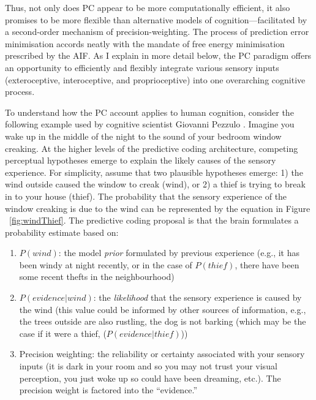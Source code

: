 \begin{CJK}{UTF8}{gbsn}
Thus, not only does PC appear to be more computationally efficient, it also promises to be more flexible than alternative models of cognition---facilitated by a second-order mechanism of precision-weighting.  The process of prediction error minimisation accords neatly with the mandate of free energy minimisation prescribed by the AIF.  As I explain in more detail below, the PC paradigm offers an opportunity to efficiently and flexibly integrate various sensory inputs (exteroceptive, interoceptive, and proprioceptive) into one overarching cognitive process.


To understand how the PC account applies to human cognition, consider the following example used by cognitive scientist Giovanni Pezzulo \textcite{Pezzulo2013}.  Imagine you wake up in the middle of the night to the sound of your bedroom window creaking.  At the higher levels of the predictive coding architecture, competing perceptual hypotheses emerge to explain the likely causes of the sensory experience.  For simplicity, assume that two plausible hypotheses emerge: 1) the wind outside caused the window to creak (wind), or 2) a thief is trying to break in to your house (thief).  The probability that the sensory experience of the window creaking is due to the wind can be represented by the equation in Figure ~\ref{fig:windThief}.  The predictive coding proposal is that the brain formulates a probability estimate based on:

\begin{enumerate}
  \item $P(wind)$: the model \textit{prior} formulated by previous experience (e.g., it has been windy at night recently, or in the case of $P(thief)$, there have been some recent thefts in the neighbourhood)
  \item $P(evidence|wind)$: the \textit{likelihood} that the sensory experience is caused by the wind (this value could be informed by other sources of information, e.g., the trees outside are also rustling, the dog is not barking (which may be the case if it were a thief, ($P(evidence|thief)$))
  \item Precision weighting: the reliability or certainty associated with your sensory inputs (it is dark in your room and so you may not trust your visual perception, you just woke up so could have been dreaming, etc.).  The precision weight is factored into the ``evidence.''
\end{enumerate}



\end{CJK}
